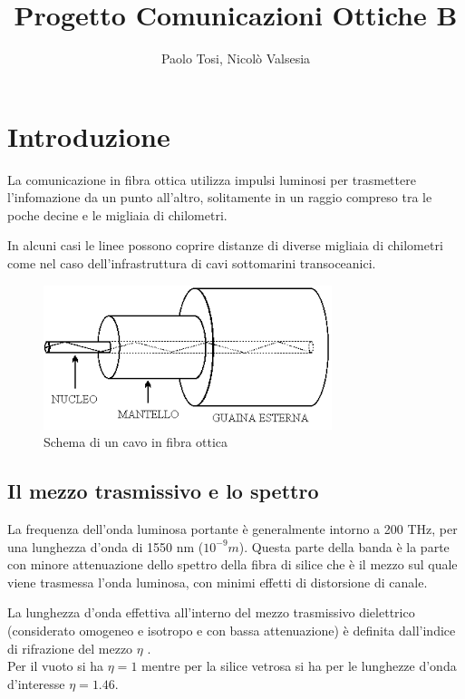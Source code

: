 \documentclass[12pt, a4paper]{article}
\title{Progetto Comunicazioni Ottiche B}
\author{Paolo Tosi, Nicolò Valsesia}
\begin{document}
\maketitle
\tableofcontents
\newpage

\section{Introduzione}
\label{sec:1}

La comunicazione in fibra ottica utilizza impulsi luminosi per trasmettere l'infomazione da un punto all'altro, solitamente in un raggio compreso tra le poche decine e le migliaia di chilometri.

\vspace{5mm}
In alcuni casi le linee possono coprire distanze di diverse migliaia di chilometri come nel caso dell'infrastruttura di cavi sottomarini transoceanici.

\begin{figure}[h!]
\centering
\includegraphics[scale=0.5]{fibramant.png}
\caption{Schema di un cavo in fibra ottica}
\label{}
\end{figure}


\subsection{Il mezzo trasmissivo e lo spettro}
\label{sub:}

La frequenza dell'onda luminosa portante è generalmente intorno a 200 THz, per una lunghezza d'onda di 1550 nm ($10^{-9} m$). Questa parte della banda è la parte con minore attenuazione dello spettro della fibra di silice che è il mezzo sul quale viene trasmessa l'onda luminosa, con minimi effetti di distorsione di canale.

La lunghezza d'onda effettiva all'interno del mezzo trasmissivo dielettrico (considerato omogeneo e isotropo e con bassa attenuazione) è definita dall'indice di rifrazione del mezzo $\eta$ .\\ Per il vuoto si ha $\eta = 1$ mentre per la silice vetrosa si ha per le lunghezze d'onda d'interesse $\eta = 1.46$.
\end{document}
